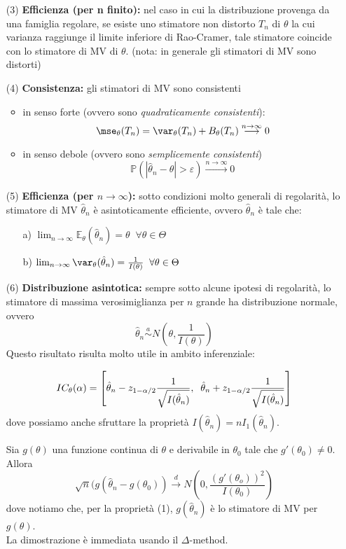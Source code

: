 \begin{enumerate}
\item[(3)] \textbf{Efficienza (per n finito):} nel caso in cui la distribuzione provenga da una famiglia regolare, se esiste uno stimatore non distorto $T_n$ di $\theta$ la cui varianza raggiunge il limite inferiore di Rao-Cramer, tale stimatore coincide con lo stimatore di MV di $\theta$. (nota: in generale gli stimatori di MV sono distorti)
\item[(4)] \textbf{Consistenza:} gli stimatori di MV sono consistenti
\begin{itemize}
\item in senso forte (ovvero sono \emph{quadraticamente consistenti}):
$$\mse_{\theta}(T_n)=\var_{\theta}(T_n)+B_{\theta}(T_n) \stackrel{n \rightarrow \infty}{\longrightarrow} 0$$
\item in senso debole (ovvero sono \emph{semplicemente consistenti})
$$\mathbb{P}(|\hat{\theta}_n-\theta|>\varepsilon) \stackrel{n \rightarrow \infty}{\longrightarrow} 0$$
\end{itemize}
\item[(5)] \textbf{Efficienza (per $n \rightarrow \infty$):} sotto condizioni molto generali di regolarità, lo stimatore di MV $\hat{\theta}_n$ è asintoticamente efficiente, ovvero $\hat{\theta}_n$ è tale che:
\begin{enumerate}
\item[a)] $\lim_{n \rightarrow \infty} \mathbb{E}_{\theta}(\hat{\theta}_n)=\theta \; \; \forall \theta \in \Theta$
\item[b)] $\lim_{n \rightarrow \infty} \var_{\theta}(\hat{\theta}_n)=\frac{1}{I(\theta)} \; \; \forall \theta \in \Theta$
\end{enumerate}
\item[(6)] \textbf{Distribuzione asintotica:} sempre sotto alcune ipotesi di regolarità, lo stimatore di massima verosimiglianza per $n$ grande ha distribuzione normale, ovvero
$$\hat{\theta}_n \stackrel{a}{\sim} N \left( \theta, \frac{1}{I(\theta)} \right)$$
Questo risultato risulta molto utile in ambito inferenziale:
\begin{esempio}
$$IC_{\theta}(\-\alpha)=\left[ \hat{\theta}_n - z_{1-\alpha/2} \frac{1}{\sqrt{I(\hat{\theta}_n)}}, \; \; \hat{\theta}_n + z_{1-\alpha/2} \frac{1}{\sqrt{I(\hat{\theta}_n)}} \right]$$
dove possiamo anche sfruttare la proprietà $I(\hat{\theta}_n)= n I_1(\hat{\theta}_n)$.
\end{esempio}
\begin{oss}
Sia $g(\theta)$ una funzione continua di $\theta$ e derivabile in $\theta_0$ tale che $g'(\theta_0) \neq 0$. Allora
$$\sqrt{n} (g(\hat{\theta}_n - g(\theta_0)) \stackrel{d}{\longrightarrow} N \left( 0, \frac{(g'(\theta_o))^2}{I(\theta_0)} \right)$$
dove notiamo che, per la proprietà (1), $g(\hat{\theta}_n)$ è lo stimatore di MV per $g(\theta)$.\\
La dimostrazione è immediata usando il $\Delta$-method.
\\
\\
\end{oss}
\end{enumerate}